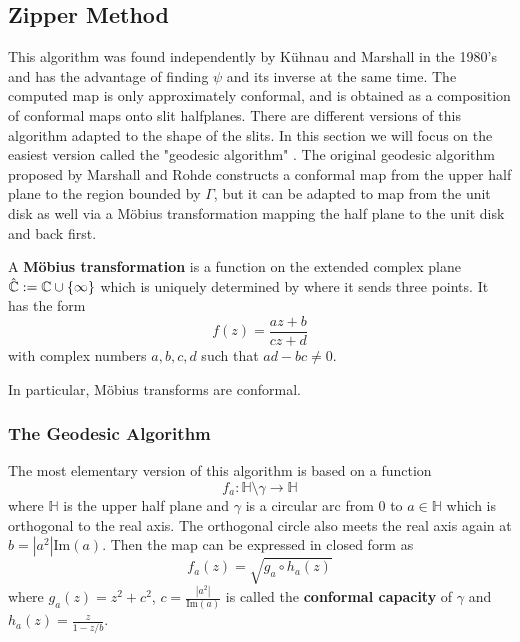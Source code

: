 \subsection{Zipper Method}\label{chap:ZipperMethod}
This algorithm was found independently by Kühnau and Marshall in the 1980's and has the advantage of finding $\psi$ and its inverse at the same time. 
The computed map is only approximately conformal, and is obtained as a composition of conformal maps onto slit halfplanes. 
There are different versions of this algorithm adapted to the shape of the slits.
In this section we will focus on the easiest version called the "geodesic algorithm" \cite{marshall2006_convergencezipperalgorithmconformal}.
The original geodesic algorithm proposed by Marshall and Rohde constructs a conformal map from the upper half plane to the region bounded by $\Gamma$, but it can be adapted to map from the unit disk as well via a Möbius transformation mapping the half plane to the unit disk and back first.

\begin{definition}
    A \textbf{Möbius transformation} is a function on the extended complex plane $\hat{\mathbb{C}}:=\mathbb{C}\cup\{\infty\}$ which is uniquely determined by where it sends three points. It has the form
    $$ f(z) = \frac{az + b}{cz + d} $$
    with complex numbers $a,b,c,d$ such that $ad - bc \neq 0$.
\end{definition}

In particular, Möbius transforms are conformal.%

\subsubsection{The Geodesic Algorithm}
The most elementary version of this algorithm is based on a function 
$$f_a: \mathbb{H}\setminus \gamma \to \mathbb{H}$$
where $\mathbb{H}$ is the upper half plane and $\gamma$ is a circular arc from $0$ to $a\in\mathbb{H}$ which is orthogonal to the real axis. The orthogonal circle also meets the real axis again at $b=|a^2|\text{Im}(a)$. Then the map can be expressed in closed form as 
$$f_a(z) = \sqrt{g_a \circ h_a (z)}$$ where $g_a(z) = z^2 + c^2$, $c=\frac{|a^2|}{\text{Im}(a)}$ is called the \textbf{conformal capacity} of $\gamma$ and $h_a(z) = \frac{z}{1-z/b}$.
\cite[Fig. 2]{marshall2006_convergencezipperalgorithmconformal}


